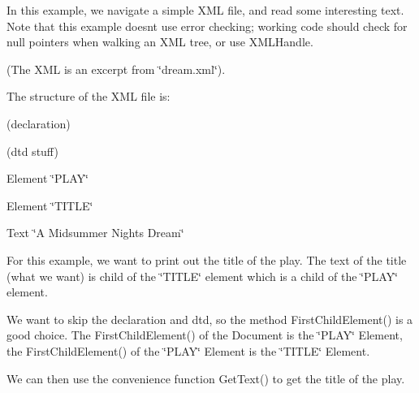  In this example, we navigate a simple X\+ML file, and read some interesting text. Note that this example doesn\textquotesingle{}t use error checking; working code should check for null pointers when walking an X\+ML tree, or use X\+M\+L\+Handle.

(The X\+ML is an excerpt from \char`\"{}dream.\+xml\char`\"{}).


\begin{DoxyCodeInclude}{0}

\end{DoxyCodeInclude}


The structure of the X\+ML file is\+:


\begin{DoxyItemize}
\item (declaration) 
\item (dtd stuff) 
\item Element \char`\"{}\+P\+L\+A\+Y\char`\"{} 
\begin{DoxyItemize}
\item Element \char`\"{}\+T\+I\+T\+L\+E\char`\"{} 
\begin{DoxyItemize}
\item Text \char`\"{}\+A Midsummer Night\textquotesingle{}s Dream\char`\"{} 
\end{DoxyItemize}
\end{DoxyItemize}
\end{DoxyItemize}

For this example, we want to print out the title of the play. The text of the title (what we want) is child of the \char`\"{}\+T\+I\+T\+L\+E\char`\"{} element which is a child of the \char`\"{}\+P\+L\+A\+Y\char`\"{} element.

We want to skip the declaration and dtd, so the method First\+Child\+Element() is a good choice. The First\+Child\+Element() of the Document is the \char`\"{}\+P\+L\+A\+Y\char`\"{} Element, the First\+Child\+Element() of the \char`\"{}\+P\+L\+A\+Y\char`\"{} Element is the \char`\"{}\+T\+I\+T\+L\+E\char`\"{} Element.


\begin{DoxyCodeInclude}{0}

\end{DoxyCodeInclude}


We can then use the convenience function Get\+Text() to get the title of the play.


\begin{DoxyCodeInclude}{0}

\end{DoxyCodeInclude}


